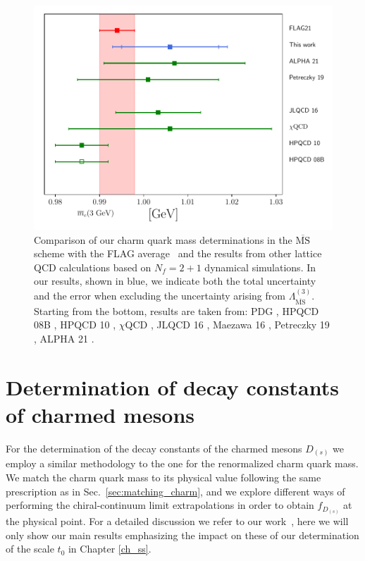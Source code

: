 \begin{figure}
	\centering
	\hspace{-0mm}
	\includegraphics[scale=0.6]{./cap6/figs/mc/mc_comparison_3gev.pdf}
	\caption{Comparison of our charm quark mass determinations in the $\overline{\textrm{MS}}$ scheme with the FLAG average~\cite{FlavourLatticeAveragingGroupFLAG:2021npn} and the results from other lattice QCD calculations based on $N_f=2+1$ dynamical simulations. In our results, shown in blue, we indicate both the total uncertainty and the error when excluding the uncertainty arising from $\Lambda^{(3)}_{\overline{\mathrm{MS}}}$. Starting from the bottom, results are taken from: PDG \cite{ParticleDataGroup:2022pth}, HPQCD 08B \cite{HPQCD:2008kxl}, HPQCD 10 \cite{McNeile:2010ji}, $\chi$QCD \cite{Yang:2014sea}, JLQCD 16 \cite{Nakayama:2016atf}, Maezawa 16 \cite{Maezawa:2016vgv}, Petreczky 19 \cite{Petreczky:2019ozv}, ALPHA 21 \cite{Heitger:2021apz}.
       }
	\label{fig:mc_comparison}
\end{figure}



\section{Determination of decay constants of charmed mesons}
\label{sec:fDs}

For the determination of the decay constants of the charmed mesons $D_{(s)}$ we employ a similar methodology to the one for the renormalized charm quark mass. We match the charm quark mass to its physical value following the same prescription as in Sec.~\ref{sec:matching_charm}, and we explore different ways of performing the chiral-continuum limit extrapolations in order to obtain $f_{D_{(s)}}$ at the physical point. For a detailed discussion we refer to our work~\citep{charm}, here we will only show our main results emphasizing the impact on these of our determination of the scale $t_0$ in Chapter \ref{ch_ss}.

